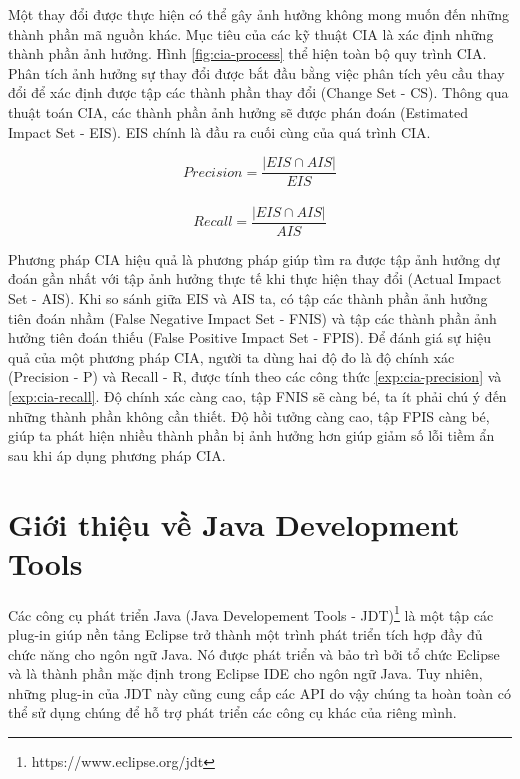 \documentclass[12pt]{report}
\begin{document}
Một thay đổi được thực hiện có thể gây ảnh hưởng không mong muốn đến những thành phần mã nguồn khác. Mục tiêu của các kỹ thuật CIA là xác định những thành phần ảnh hưởng. Hình \ref{fig:cia-process} thể hiện toàn bộ quy trình CIA\cite{cia-survey}. Phân tích ảnh hưởng sự thay đổi được bắt đầu bằng việc phân tích yêu cầu thay đổi để xác định được tập các thành phần thay đổi (Change Set - CS). Thông qua thuật toán CIA, các thành phần ảnh hưởng sẽ được phán đoán (Estimated Impact Set - EIS). EIS chính là đầu ra cuối cùng của quá trình CIA.

\begin{equation}
Precision = \frac{|EIS \cap AIS|}{EIS}
\label{exp:cia-precision}
\end{equation}
\\
\begin{equation}
Recall = \frac{|EIS \cap AIS|}{AIS}
\label{exp:cia-recall}
\end{equation}

Phương pháp CIA hiệu quả là phương pháp giúp tìm ra được tập ảnh hưởng dự đoán gần nhất với tập ảnh hưởng thực tế khi thực hiện thay đổi (Actual Impact Set - AIS). Khi so sánh giữa EIS và AIS ta, có tập các thành phần ảnh hưởng tiên đoán nhầm (False Negative Impact Set - FNIS) và tập các thành phần ảnh hưởng tiên đoán thiếu (False Positive Impact Set - FPIS). Để đánh giá sự hiệu quả của một phương pháp CIA, người ta dùng hai độ đo là độ chính xác (Precision - P) và Recall - R, được tính theo các công thức \ref{exp:cia-precision} và \ref{exp:cia-recall}. Độ chính xác càng cao, tập FNIS sẽ càng bé, ta ít phải chú ý đến những thành phần không cần thiết. Độ hồi tưởng càng cao, tập FPIS càng bé, giúp ta phát hiện nhiều thành phần bị ảnh hưởng hơn giúp giảm số lỗi tiềm ẩn sau khi áp dụng phương pháp CIA.

\section{Giới thiệu về Java Development Tools}
Các công cụ phát triển Java (Java Developement Tools - JDT)\footnote{https://www.eclipse.org/jdt} là một tập các plug-in giúp nền tảng Eclipse trở thành một trình phát triển tích hợp đầy đủ chức năng cho ngôn ngữ Java. Nó được phát triển và bảo trì bởi tổ chức Eclipse và là thành phần mặc định trong Eclipse IDE cho ngôn ngữ Java. Tuy nhiên, những plug-in của JDT này cũng cung cấp các API do vậy chúng ta hoàn toàn có thể sử dụng chúng để hỗ trợ phát triển các công cụ khác của riêng mình.
\end{document}
